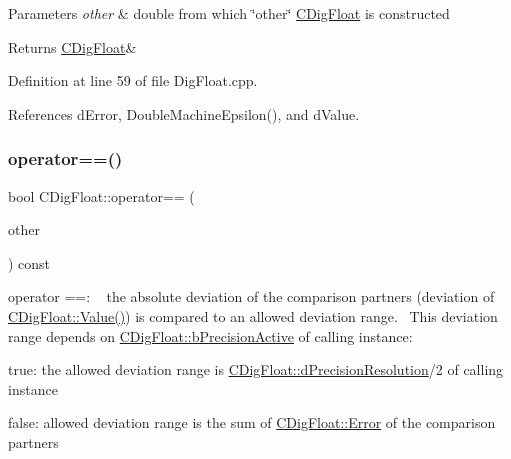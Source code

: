 \begin{DoxyParams}{Parameters}
{\em other} & double from which \char`\"{}other\char`\"{} \hyperlink{classCDigFloat}{C\+Dig\+Float} is constructed \\
\hline
\end{DoxyParams}
\begin{DoxyReturn}{Returns}
\hyperlink{classCDigFloat}{C\+Dig\+Float}\& 
\end{DoxyReturn}


Definition at line 59 of file Dig\+Float.\+cpp.



References d\+Error, Double\+Machine\+Epsilon(), and d\+Value.

\mbox{\label{classCDigFloat_ad8980d984bf2bab71d15b830fd0180a5}} 
\subsubsection{\texorpdfstring{operator==()}{operator==()}\hspace{0.1cm}{\footnotesize\ttfamily [1/2]}}
{\footnotesize\ttfamily bool C\+Dig\+Float\+::operator== (\begin{DoxyParamCaption}\item[{const \hyperlink{classCDigFloat}{C\+Dig\+Float} \&}]{other }\end{DoxyParamCaption}) const}



operator ==\+: ~\newline
 the absolute deviation of the comparison partners (deviation of \hyperlink{classCDigFloat_af74b8cd0935294b6371f551b7a1ff640}{C\+Dig\+Float\+::\+Value()}) is compared to an allowed deviation range.~\newline
 This deviation range depends on \hyperlink{classCDigFloat_aa1f6ed0312a2aa6ae5ee2abd195adefc}{C\+Dig\+Float\+::b\+Precision\+Active} of calling instance\+: 


\begin{DoxyItemize}
\item true\+: the allowed deviation range is \hyperlink{classCDigFloat_a7f9809fa0b25da57f5c8c18a02b7d1a7}{C\+Dig\+Float\+::d\+Precision\+Resolution}/2 of calling instance
\item false\+: allowed deviation range is the sum of \hyperlink{classCDigFloat_a1b067b1bde507408956fa65bef7368bb}{C\+Dig\+Float\+::\+Error} of the comparison partners
\end{DoxyItemize}



